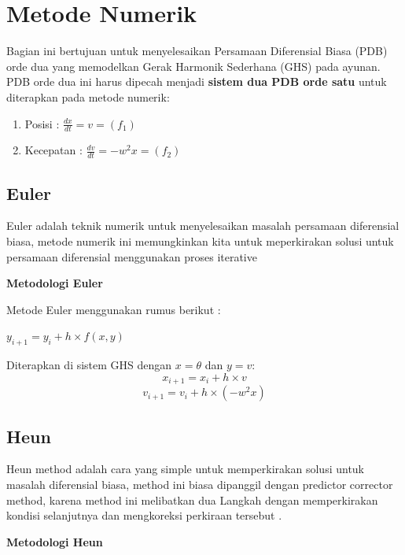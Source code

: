 \section{Metode Numerik}
Bagian ini bertujuan untuk menyelesaikan Persamaan Diferensial Biasa (PDB) orde dua
yang memodelkan Gerak Harmonik Sederhana (GHS) pada ayunan. PDB orde dua ini harus dipecah menjadi \textbf{sistem dua PDB orde satu} untuk diterapkan pada metode numerik:
\vspace{1em}

\begin{enumerate}
    \item Posisi : $\frac{dx}{dt} = v = (f_1)$\cite{getaranmekanik2020}
    \item Kecepatan : $\frac{dv}{dt} = -w^2x = (f_2)$\cite{getaranmekanik2020} 
\end{enumerate}


\subsection{Euler}
Euler adalah teknik numerik untuk menyelesaikan masalah persamaan diferensial biasa,
metode numerik ini memungkinkan kita untuk meperkirakan solusi untuk persamaan diferensial
menggunakan proses iterative \cite{euler_method}
\vspace{0.3em}

\noindent
\textbf{Metodologi Euler}

\noindent
Metode Euler menggunakan rumus berikut \cite{euler_method_free}:  

\begin{center}
    $y_{i + 1} = y_i + h \times f(x, y)$
\end{center}

\noindent
Diterapkan di sistem GHS dengan $x = \theta$ dan $y = v$:  
$$x_{i + 1} = x_i + h \times v$$
$$v_{i + 1} = v_i + h \times (-w^2x)$$

\subsection{Heun}
Heun method adalah cara yang simple untuk memperkirakan solusi untuk masalah diferensial biasa,
method ini biasa dipanggil dengan predictor corrector method, karena method ini melibatkan dua Langkah
dengan memperkirakan kondisi selanjutnya dan mengkoreksi perkiraan tersebut \cite{heun_method}.
\vspace{0.3em}

\noindent
\textbf{Metodologi Heun}

